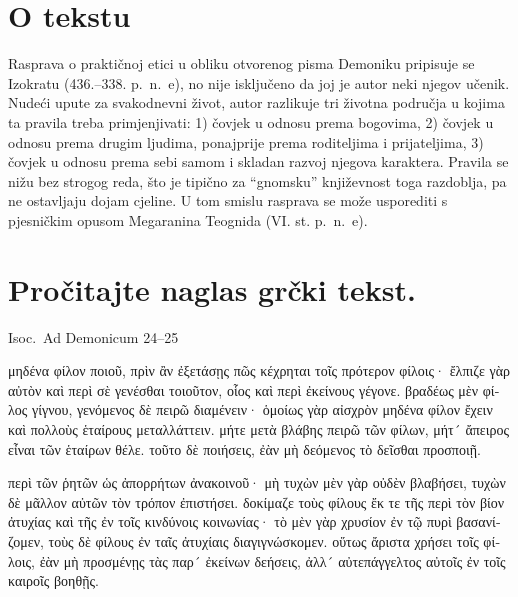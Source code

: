 


\section*{O tekstu}

Rasprava o praktičnoj etici u obliku otvorenog pisma Demoniku pripisuje se Izokratu (436.–338. p.~n.~e), no nije isključeno da joj je autor neki njegov učenik. Nudeći upute za svakodnevni život, autor razlikuje tri životna područja u kojima ta pravila treba primjenjivati: 1) čovjek u odnosu prema bogovima, 2) čovjek u odnosu prema drugim ljudima, ponajprije prema roditeljima i prijateljima, 3) čovjek u odnosu prema sebi samom i skladan razvoj njegova karaktera. Pravila se nižu bez strogog reda, što je tipično za ``gnomsku'' književnost toga razdoblja, pa ne ostavljaju dojam cjeline. U tom smislu rasprava se može usporediti s pjesničkim opusom Megaranina Teognida (VI. st. p.~n.~e).


\section*{Pročitajte naglas grčki tekst.}

Isoc.\ Ad Demonicum 24–25


\medskip


{\large

\begin{greek}

\noindent μηδένα φίλον ποιοῦ, πρὶν ἂν ἐξετάσῃς πῶς κέχρηται τοῖς πρότερον φίλοις· ἔλπιζε γὰρ αὐτὸν καὶ περὶ σὲ γενέσθαι τοιοῦτον, οἷος καὶ περὶ ἐκείνους γέγονε. βραδέως μὲν φίλος γίγνου, γενόμενος δὲ πειρῶ διαμένειν· ὁμοίως γὰρ αἰσχρὸν μηδένα φίλον ἔχειν καὶ πολλοὺς ἑταίρους μεταλλάττειν. μήτε μετὰ βλάβης πειρῶ τῶν φίλων, μήτ´ ἄπειρος εἶναι τῶν ἑταίρων θέλε. τοῦτο δὲ ποιήσεις, ἐὰν μὴ δεόμενος τὸ δεῖσθαι προσποιῇ.

\noindent περὶ τῶν ῥητῶν ὡς ἀπορρήτων ἀνακοινοῦ· μὴ τυχὼν μὲν γὰρ οὐδὲν βλαβήσει, τυχὼν δὲ μᾶλλον αὐτῶν τὸν τρόπον ἐπιστήσει. δοκίμαζε τοὺς φίλους ἔκ τε τῆς περὶ τὸν βίον ἀτυχίας καὶ τῆς ἐν τοῖς κινδύνοις κοινωνίας· τὸ μὲν γὰρ χρυσίον ἐν τῷ πυρὶ βασανίζομεν, τοὺς δὲ φίλους ἐν ταῖς ἀτυχίαις διαγιγνώσκομεν. οὕτως ἄριστα χρήσει τοῖς φίλοις, ἐὰν μὴ προσμένῃς τὰς παρ´ ἐκείνων δεήσεις, ἀλλ´ αὐτεπάγγελτος αὐτοῖς ἐν τοῖς καιροῖς βοηθῇς.

\end{greek}

}


